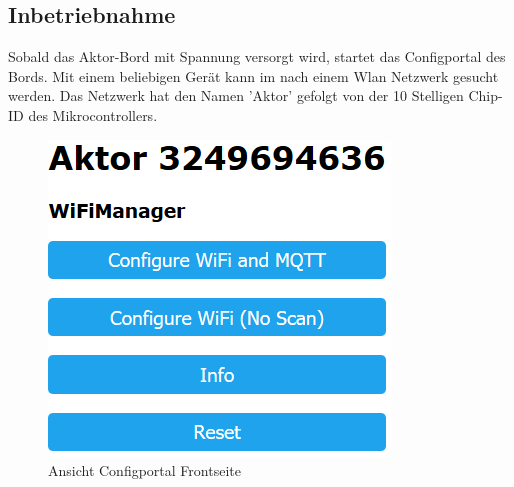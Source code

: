 \subsection{Inbetriebnahme}
Sobald das Aktor-Bord mit Spannung versorgt wird, startet das Configportal des Bords. Mit einem beliebigen Gerät kann im nach einem Wlan Netzwerk gesucht werden. Das Netzwerk hat den Namen 'Aktor' gefolgt von der 10 Stelligen Chip-ID des Mikrocontrollers. 
 
\begin{figure}[H]
	\begin{center}
	\begin{minipage}[b]{.3\linewidth} %
		\includegraphics[width=\textwidth]{graphics/Configportal.PNG}
		\caption{Ansicht Configportal Frontseite}
	\end{minipage}
	\hspace{.1\linewidth}%
	\begin{minipage}[b]{.3\linewidth} %

\end{minipage}
\end{center}
\end{figure}
